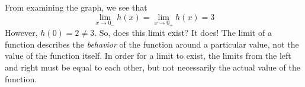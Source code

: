 
From examining the graph, we see that $$\lim_{x\to0_-}h(x) = \lim_{x\to0_+}h(x) = 3$$
However, $h(0) = 2 \neq 3$. So, does this limit exist? It does! The limit of a function describes the \textit{behavior} of the function around a particular value, not the value of the function itself. In order for a limit to exist, the limits from the left and right must be equal to each other, but not necessarily the actual value of the function. 

